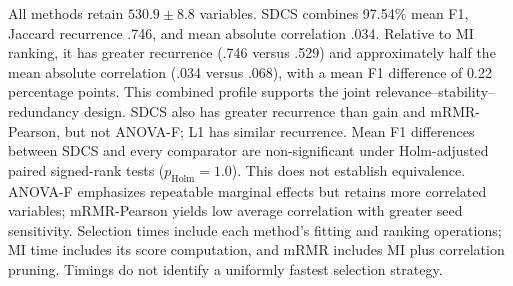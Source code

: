 \documentclass[10pt]{article}
\newenvironment{bluechange}{\color{black}}{}
\begin{document}
\begin{bluechange}
All methods retain $530.9\pm8.8$ variables. SDCS combines 97.54\% mean F1, Jaccard recurrence .746, and mean absolute correlation .034. Relative to MI ranking, it has greater recurrence (.746 versus .529) and approximately half the mean absolute correlation (.034 versus .068), with a mean F1 difference of 0.22 percentage points. This combined profile supports the joint relevance--stability--redundancy design. SDCS also has greater recurrence than gain and mRMR-Pearson, but not ANOVA-F; L1 has similar recurrence. Mean F1 differences between SDCS and every comparator are non-significant under Holm-adjusted paired signed-rank tests ($p_{\mathrm{Holm}}=1.0$). This does not establish equivalence. ANOVA-F emphasizes repeatable marginal effects but retains more correlated variables; mRMR-Pearson yields low average correlation with greater seed sensitivity. Selection times include each method's fitting and ranking operations; MI time includes its score computation, and mRMR includes MI plus correlation pruning. Timings do not identify a uniformly fastest selection strategy.
\end{bluechange}
\end{document}
